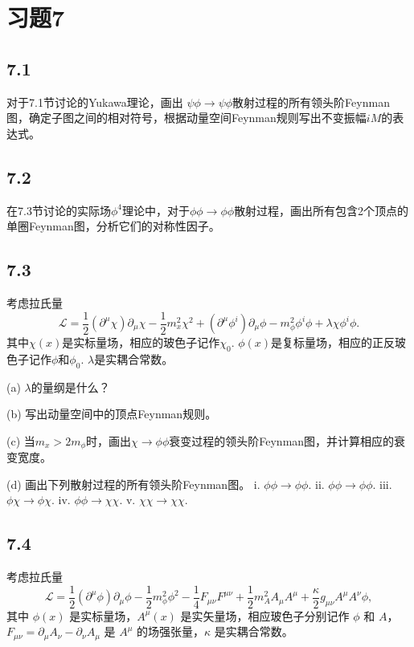 \section{习题7}

\newpage
\subsection{7.1}
对于7.1节讨论的Yukawa理论，画出 $\psi \phi \rightarrow \psi \phi$散射过程的所有领头阶Feynman图，确定子图之间的相对符号，根据动量空间Feynman规则写出不变振幅$iM$的表达式。

\newpage
\subsection{7.2}
在7.3节讨论的实际场$\phi^4$理论中，对于$\phi \phi \rightarrow \phi \phi$散射过程，画出所有包含2个顶点的单圈Feynman图，分析它们的对称性因子。

\newpage
\subsection{7.3}
考虑拉氏量
$$ \mathcal{L} = \frac{1}{2}(\partial^\mu \chi)\partial_\mu \chi - \frac{1}{2}m_x^2 \chi^2 + (\partial^\mu \phi^i)\partial_\mu \phi - m_{\phi}^2 \phi^i \phi + \lambda \chi \phi^i \phi. \tag{7.159} $$
其中$\chi(x)$是实标量场，相应的玻色子记作$\chi_0$. $\phi(x)$是复标量场，相应的正反玻色子记作$\phi$和$\phi_0$. $\lambda$是实耦合常数。

(a) $\lambda$的量纲是什么？

(b) 写出动量空间中的顶点Feynman规则。

(c) 当$m_x > 2m_{\phi}$时，画出$\chi \rightarrow \phi \phi$衰变过程的领头阶Feynman图，并计算相应的衰变宽度。

(d) 画出下列散射过程的所有领头阶Feynman图。
i. $\phi \phi \rightarrow \phi \phi$.
ii. $\phi \phi \rightarrow \phi \phi$.
iii. $\phi \chi \rightarrow \phi \chi$.
iv. $\phi \phi \rightarrow \chi \chi$.
v. $\chi \chi \rightarrow \chi \chi$.

\newpage
\subsection{7.4}
考虑拉氏量
$$ \mathcal{L} = \frac{1}{2}(\partial^\mu \phi)\partial_\mu \phi - \frac{1}{2}m_{\phi}^2 \phi^2 - \frac{1}{4}F_{\mu \nu}F^{\mu \nu} + \frac{1}{2}m_A^2A_\mu A^\mu + \frac{\kappa}{2}g_{\mu \nu}A^\mu A^\nu \phi, \tag{7.160} $$
其中 $\phi(x)$ 是实标量场，$A^\mu(x)$ 是实矢量场，相应玻色子分别记作 $\phi$ 和 $A$，$F_{\mu\nu} = \partial_\mu A_\nu - \partial_\nu A_\mu$ 是 $A^\mu$ 的场强张量，$\kappa$ 是实耦合常数。

